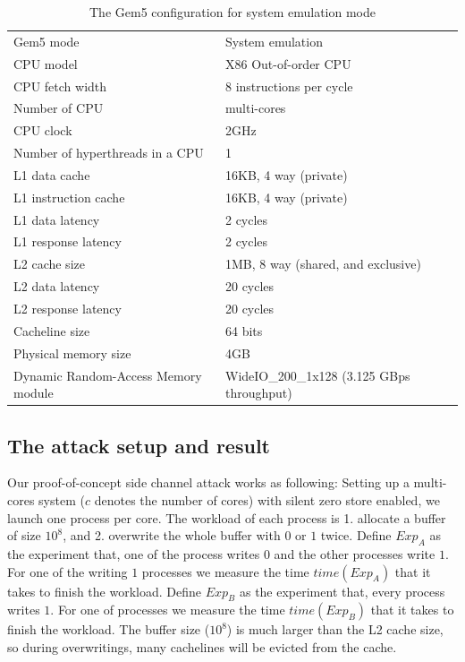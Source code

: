 \documentclass{iacrtrans}
\begin{document}
\begin{table}[]
\begin{tabular}{ll}
Gem5 mode                           & System emulation                       \\
CPU model                           & X86 Out-of-order CPU                   \\
CPU fetch width                     & 8 instructions per cycle               \\
Number of CPU                       & multi-cores                            \\
CPU clock                           & 2GHz                                   \\
Number of hyperthreads in a CPU     & 1                                      \\
L1 data cache                       & 16KB, 4 way (private)                  \\
L1 instruction cache                & 16KB, 4 way (private)                  \\
L1 data latency                     & 2 cycles                               \\
L1 response latency                 & 2 cycles                               \\
L2 cache size                       & 1MB, 8 way  (shared, and exclusive)    \\
L2 data latency                     & 20 cycles                              \\
L2 response latency                 & 20 cycles                              \\
Cacheline size                      & 64 bits                                \\
Physical memory size                & 4GB                                    \\
Dynamic Random-Access Memory module & WideIO\_200\_1x128 (3.125 GBps throughput)
\end{tabular}
\caption{The Gem5 configuration for system emulation mode}
\label{tab:gem5_config_se}
\end{table}


\subsection{The attack setup and result}
Our proof-of-concept side channel attack works as following: Setting up a multi-cores system ($c$ denotes the number of cores) with silent zero store enabled, we launch one process per core. The workload of each process is 1. allocate a buffer of size $10^8$, and 2. overwrite the whole buffer with $0$ or $1$ twice. Define $Exp_A$ as the experiment that, one of the process writes $0$ and the other processes write $1$. For one of the writing $1$ processes we measure the time $time(Exp_A)$ that it takes to finish the workload. Define $Exp_B$ as the experiment that, every process writes $1$. For one of processes we measure the time $time(Exp_B)$ that it takes to finish the workload. The buffer size ($10^8$) is much larger than the L2 cache size, so during overwritings, many cachelines will be evicted from the cache. 
\end{document}
